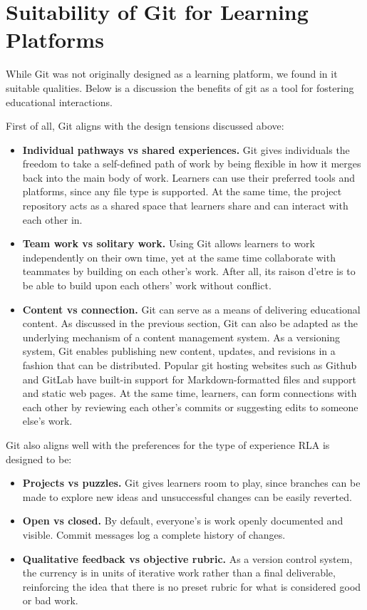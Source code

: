 \documentclass[12pt,twoside]{mitthesis}
\newcommand{\draft}[1]{{#1}}
\begin{document}
\section{Suitability of Git for Learning Platforms}

\draft{While Git was not originally designed as a learning platform, we found in it suitable qualities. Below is a discussion the benefits of git as a tool for fostering educational interactions.

First of all, Git aligns with the design tensions discussed above: 
\begin{itemize}
\item \textbf{Individual pathways vs shared experiences.} Git gives individuals the freedom to take a self-defined path of work by being flexible in how it merges back into the main body of work. Learners can use their preferred tools and platforms, since any file type is supported. At the same time, the project repository acts as a shared space that learners share and can interact with each other in.
\item \textbf{Team work vs solitary work.} Using Git allows learners to work independently on their own time, yet at the same time collaborate with teammates by building on each other's work. After all, its raison d'etre is to be able to build upon each others' work without conflict.
\item \textbf{Content vs connection.} Git can serve as a means of delivering educational content. As discussed in the previous section, Git can also be adapted as the underlying mechanism of a content management system. As a versioning system, Git enables publishing new content, updates, and revisions in a fashion that can be distributed. Popular git hosting websites such as Github and GitLab have built-in support for Markdown-formatted files and support and static web pages. At the same time, learners, can form connections with each other by reviewing each other's commits or suggesting edits to someone else's work. 
\end{itemize}

Git also aligns well with the preferences for the type of experience RLA is designed to be:
\begin{itemize}
\item \textbf{Projects vs puzzles.} Git gives learners room to play, since branches can be made to explore new ideas and unsuccessful changes can be easily reverted.  
\item \textbf{Open vs closed.} By default, everyone's is work openly documented and visible. Commit messages log a complete history of changes.
\item \textbf{Qualitative feedback vs objective rubric.} As a version control system, the currency is in units of iterative work rather than a final deliverable, reinforcing the idea that there is no preset rubric for what is considered good or bad work.
\end{itemize}

}
\end{document}
